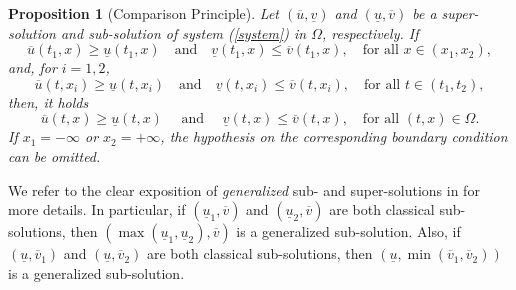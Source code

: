 \documentclass[11pt,a4paper]{article}
\newtheorem{proposition}[theorem]{\textbf{Proposition}}
\numberwithin{equation}{section}
\numberwithin{figure}{section}
\begin{document}
\begin{proposition}[Comparison Principle]%
Let $(\overline{u},\underline{v})$ and $(\underline{u},\overline{v})$ be a super-solution and sub-solution of system (\ref{system}) in $\Omega$, respectively. If
$$
\overline{u}(t_1,x)\ge \underline{u}(t_1,x) \quad \text{and} \quad \underline{v}(t_1,x)\le\overline{v}(t_1,x),\quad\text{for all } x\in (x_1,x_2),
$$
and, for $i=1,2$, 
$$
\overline{u}(t,x_i)\ge \underline{u}(t,x_i) \quad \text{and} \quad \underline{v}(t,x_i)\le\overline{v}(t,x_i),\quad\text{for all } t\in(t_1,t_2),
$$
then, it holds
$$ 
\overline{u}(t,x) \ge\underline{u}(t,x) \quad \text{ and } \quad \underline{v}(t,x)\le\overline{v}(t,x),\quad  \text{for all } (t,x)\in\Omega.
$$
If $x_1=-\infty$ or $x_2=+\infty$, the hypothesis on the corresponding boundary condition can be omitted.
\end{proposition}


We refer to the clear exposition of  {\it generalized} sub- and super-solutions in \cite[subsection 2.1]{Girardin Lam} for more  details. In particular,  if $(\underline {u}_1,\overline{v})$  and $(\underline {u}_2, \overline{v})$ are both classical sub-solutions, then $(\max(\underline {u}_1,\underline{u}_2),\overline v)$ is a generalized sub-solution. Also, 
if $(\underline u,\overline{v}_1)$    and $(\underline u, \overline{v}_2)$ are both classical sub-solutions, then $(\underline u,\min(\overline{v}_1,\overline{v}_2))$ is a generalized sub-solution. 
\end{document}
